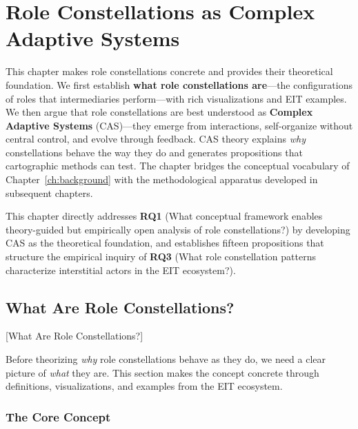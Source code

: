 \documentclass[../main.tex]{subfiles}
\begin{document}
\chapter{Role Constellations as Complex Adaptive Systems}
\margintoc

\begin{chapteroverview}
This chapter makes role constellations concrete and provides their theoretical foundation. We first establish \textbf{what role constellations are}---the configurations of roles that intermediaries perform---with rich visualizations and EIT examples. We then argue that role constellations are best understood as \textbf{Complex Adaptive Systems} (CAS)---they emerge from interactions, self-organize without central control, and evolve through feedback. CAS theory explains \emph{why} constellations behave the way they do and generates propositions that cartographic methods can test. The chapter bridges the conceptual vocabulary of Chapter~\ref{ch:background} with the methodological apparatus developed in subsequent chapters.

This chapter directly addresses \textbf{RQ1} (What conceptual framework enables theory-guided but empirically open analysis of role constellations?) by developing CAS as the theoretical foundation, and establishes fifteen propositions that structure the empirical inquiry of \textbf{RQ3} (What role constellation patterns characterize interstitial actors in the EIT ecosystem?).
\end{chapteroverview}


\section{What Are Role Constellations?}[What Are Role Constellations?]

Before theorizing \emph{why} role constellations behave as they do, we need a clear picture of \emph{what} they are. This section makes the concept concrete through definitions, visualizations, and examples from the EIT ecosystem.

\subsection{The Core Concept}
\end{document}
